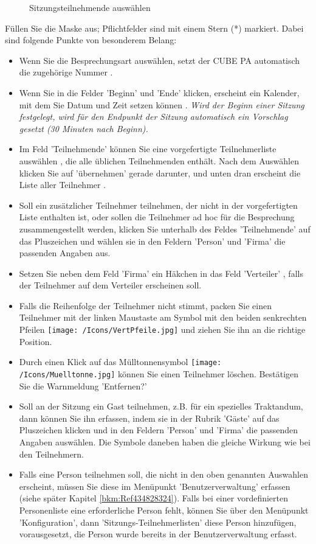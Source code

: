\begin{figure}[H]
\caption{Sitzungsteilnehmende auswählen}
\end{figure}

Füllen Sie die Maske aus; Pflichtfelder sind mit einem Stern (*) markiert. Dabei sind folgende Punkte von besonderem Belang:

\begin{itemize}
\item 
Wenn Sie die Besprechungsart auswählen, setzt der CUBE PA automatisch die zugehörige Nummer .
\item 
Wenn Sie in die Felder 'Beginn' und 'Ende' klicken, erscheint ein Kalender, mit dem Sie Datum und Zeit setzen können . \textit{Wird der Beginn einer Sitzung festgelegt, wird für den Endpunkt der Sitzung automatisch ein Vorschlag gesetzt (30 Minuten nach Beginn).}
\item 
Im Feld 'Teilnehmende' können Sie eine vorgefertigte Teilnehmerliste auswählen , die alle üblichen Teilnehmenden enthält. Nach dem Auswählen klicken Sie auf 'übernehmen'  gerade darunter, und unten dran erscheint die Liste aller Teilnehmer .
\item 
Soll ein zusätzlicher Teilnehmer teilnehmen, der nicht in der vorgefertigten Liste enthalten ist, oder sollen die Teilnehmer ad hoc für die Besprechung zusammengestellt werden, klicken Sie unterhalb des Feldes 'Teilnehmende' auf das Pluszeichen  und wählen sie in den Feldern 'Person' und 'Firma' die passenden Angaben aus. 
\item
Setzen Sie neben dem Feld 'Firma' ein Häkchen in das Feld 'Verteiler' , falls der Teilnehmer auf dem Verteiler erscheinen soll.
\item 
Falls die Reihenfolge der Teilnehmer nicht stimmt, packen Sie einen Teilnehmer mit der linken Maustaste am Symbol mit den beiden senkrechten Pfeilen \texttt{[image: /Icons/VertPfeile.jpg]}  und ziehen Sie ihn an die richtige Position.
\item 
Durch einen Klick auf das Mülltonnensymbol \texttt{[image: /Icons/Muelltonne.jpg]}  können Sie einen Teilnehmer löschen. Bestätigen Sie die Warnmeldung 'Entfernen?'
\item 
Soll an der Sitzung ein Gast teilnehmen, z.B. für ein spezielles Traktandum, dann können Sie ihn erfassen, indem sie in der Rubrik 'Gäste' auf das Pluszeichen klicken und in den Feldern 'Person' und 'Firma' die passenden Angaben auswählen. Die Symbole daneben haben die gleiche Wirkung wie bei den Teilnehmern.
\item 
Falls eine Person teilnehmen soll, die nicht in den oben genannten Auswahlen erscheint, müssen Sie diese im Menüpunkt 'Benutzerverwaltung' erfassen (siehe später Kapitel \ref{bkm:Ref434828324}). Falls bei einer vordefinierten Personenliste eine erforderliche Person fehlt, können Sie über den Menüpunkt 'Konfiguration', dann 'Sitzungs-Teilnehmerlisten' diese Person hinzufügen, vorausgesetzt, die Person wurde bereits in der Benutzerverwaltung erfasst.
\end{itemize}

